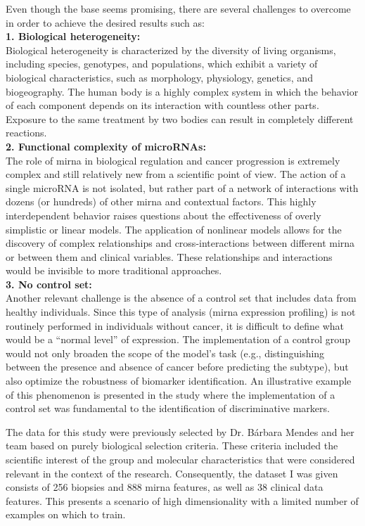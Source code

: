 Even though the base seems promising, there are several challenges to overcome
in order to achieve the desired results such as: \\ \textbf{1. Biological
  heterogeneity:} \\ \label{sec:biological-heterogeneity} Biological
heterogeneity is characterized by the diversity of living organisms, including
species, genotypes, and populations, which exhibit a variety of biological
characteristics, such as morphology, physiology, genetics, and biogeography.
The human body is a highly complex system in which the behavior of each
component depends on its interaction with countless other parts. Exposure to
the same treatment by two bodies can result in completely different reactions.
\\ \textbf{2. Functional complexity of microRNAs:} \label{sec:mirna_complexity}
\\ The role of \gls{mirna} in biological regulation and cancer progression is
extremely complex and still relatively new from a scientific point of view. The
action of a single microRNA is not isolated, but rather part of a network of
interactions with dozens (or hundreds) of other \gls{mirna} and contextual
factors. This highly interdependent behavior raises questions about the
effectiveness of overly simplistic or linear models. The application of
nonlinear models allows for the discovery of complex relationships and
cross-interactions between different \gls{mirna} or between them and clinical
variables. These relationships and interactions would be invisible to more
traditional approaches. \\ \textbf{3. No control set:} \\ Another relevant
challenge is the absence of a control set that includes data from healthy
individuals. Since this type of analysis (\gls{mirna} expression profiling) is
not routinely performed in individuals without cancer, it is difficult to
define what would be a “normal level” of expression. The implementation of a
control group would not only broaden the scope of the model's task (e.g.,
distinguishing between the presence and absence of cancer before predicting the
subtype), but also optimize the robustness of biomarker identification. An
illustrative example of this phenomenon is presented in the study
\textcite{ml_gastric_Azari2023} where the implementation of a control set was
fundamental to the identification of discriminative markers.

The data for this study were previously selected by Dr. Bárbara Mendes and her
team based on purely biological selection criteria. These criteria included the
scientific interest of the group and molecular characteristics that were
considered relevant in the context of the research. Consequently, the dataset I
was given consists of 256 biopsies and 888 \gls{mirna} features, as well as 38
clinical data features. This presents a scenario of high dimensionality with a
limited number of examples on which to train.

